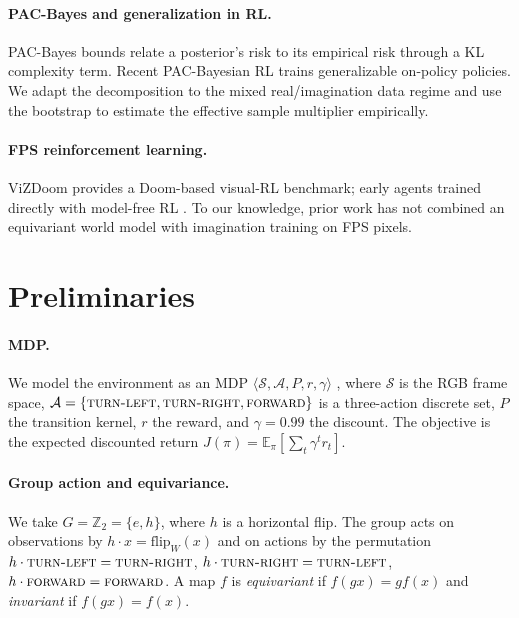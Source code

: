 \documentclass[preprint,12pt]{elsarticle}
\begin{document}
\paragraph{PAC-Bayes and generalization in RL.}
PAC-Bayes bounds \cite{mcallester1999} relate a posterior's risk to its
empirical risk through a KL complexity term. Recent PAC-Bayesian RL
\cite{pacbayesrl2025} trains generalizable on-policy policies. We adapt the
decomposition to the mixed real/imagination data regime and use the bootstrap
\cite{bootstrap1993} to estimate the effective sample multiplier empirically.

\paragraph{FPS reinforcement learning.}
ViZDoom \cite{vizdoom2016} provides a Doom-based visual-RL benchmark; early
agents trained directly with model-free RL \cite{fps2017}. To our knowledge,
prior work has not combined an equivariant world model with imagination
training on FPS pixels.

\section{Preliminaries}\label{sec:prelim}

\paragraph{MDP.}
We model the environment as an MDP
$\langle\mathcal S,\mathcal A,P,r,\gamma\rangle$ \cite{suttonbarto2018},
where $\mathcal S$ is the RGB frame space,
$\mathcal A=\{\textsc{turn-left},\textsc{turn-right},\textsc{forward}\}$ is a
three-action discrete set, $P$ the transition kernel, $r$ the reward, and
$\gamma=0.99$ the discount. The objective is the expected discounted return
$J(\pi)=\mathbb E_{\pi}[\sum_t\gamma^t r_t]$.

\paragraph{Group action and equivariance.}
We take $G=\mathbb Z_2=\{e,h\}$, where $h$ is a horizontal flip. The group
acts on observations by $h\cdot x=\mathrm{flip}_W(x)$ and on actions by the
permutation $h\cdot\textsc{turn-left}=\textsc{turn-right}$,
$h\cdot\textsc{turn-right}=\textsc{turn-left}$,
$h\cdot\textsc{forward}=\textsc{forward}$. A map $f$ is
\emph{equivariant} if $f(gx)=g f(x)$ and \emph{invariant} if $f(gx)=f(x)$.
\end{document}
